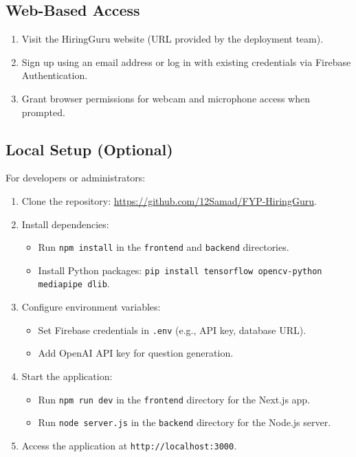 \subsection{Web-Based Access}
\begin{enumerate}
    \item Visit the HiringGuru website (URL provided by the deployment team).
    \item Sign up using an email address or log in with existing credentials via Firebase Authentication.
    \item Grant browser permissions for webcam and microphone access when prompted.
\end{enumerate}

\subsection{Local Setup (Optional)}
For developers or administrators:
\begin{enumerate}
    \item Clone the repository: \url{https://github.com/12Samad/FYP-HiringGuru}.
    \item Install dependencies:
        \begin{itemize}
            \item Run \texttt{npm install} in the \texttt{frontend} and \texttt{backend} directories.
            \item Install Python packages: \texttt{pip install tensorflow opencv-python mediapipe dlib}.
        \end{itemize}
    \item Configure environment variables:
        \begin{itemize}
            \item Set Firebase credentials in \texttt{.env} (e.g., API key, database URL).
            \item Add OpenAI API key for question generation.
        \end{itemize}
    \item Start the application:
        \begin{itemize}
            \item Run \texttt{npm run dev} in the \texttt{frontend} directory for the Next.js app.
            \item Run \texttt{node server.js} in the \texttt{backend} directory for the Node.js server.
        \end{itemize}
    \item Access the application at \texttt{http://localhost:3000}.
\end{enumerate}

